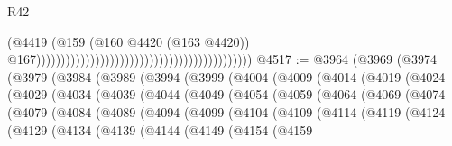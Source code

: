 \begin{lexlean}{R42}
\begin{coremodule}
                                                                                        (@4419
                                                                                          (@159
                                                                                            (@160
                                                                                              @4420
                                                                                              (@163
                                                                                                @4420))
                                                                                            @167))))))))))))))))))))))))))))))))))))))))))))
@4517 := @3964
    (@3969
      (@3974
        (@3979
          (@3984
            (@3989
              (@3994
                (@3999
                  (@4004
                    (@4009
                      (@4014
                        (@4019
                          (@4024
                            (@4029
                              (@4034
                                (@4039
                                  (@4044
                                    (@4049
                                      (@4054
                                        (@4059
                                          (@4064
                                            (@4069
                                              (@4074
                                                (@4079
                                                  (@4084
                                                    (@4089
                                                      (@4094
                                                        (@4099
                                                          (@4104
                                                            (@4109
                                                              (@4114
                                                                (@4119
                                                                  (@4124
                                                                    (@4129
                                                                      (@4134
                                                                        (@4139
                                                                          (@4144
                                                                            (@4149
                                                                              (@4154
                                                                                (@4159

\end{coremodule}
\end{lexlean}
